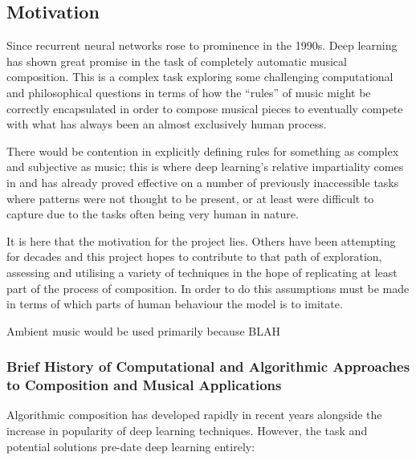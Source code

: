 \documentclass[12pt,]{article}
\begin{document}
\hypertarget{motivation}{%
\subsection{Motivation}\label{motivation}}

Since recurrent neural networks rose to prominence in the 1990s. Deep
learning has shown great promise in the task of completely automatic
musical composition. This is a complex task exploring some challenging
computational and philosophical questions in terms of how the ``rules''
of music might be correctly encapsulated in order to compose musical
pieces to eventually compete with what has always been an almost
exclusively human process.

There would be contention in explicitly defining rules for something as
complex and subjective as music; this is where deep learning's relative
impartiality comes in and has already proved effective on a number of
previously inaccessible tasks where patterns were not thought to be
present, or at least were difficult to capture due to the tasks often
being very human in nature.

It is here that the motivation for the project lies. Others have been
attempting for decades and this project hopes to contribute to that path
of exploration, assessing and utilising a variety of techniques in the
hope of replicating at least part of the process of composition. In
order to do this assumptions must be made in terms of which parts of
human behaviour the model is to imitate.

Ambient music would be used primarily because BLAH

\hypertarget{brief-history-of-computational-and-algorithmic-approaches-to-composition-and-musical-applications}{%
\subsubsection{Brief History of Computational and Algorithmic Approaches
to Composition and Musical
Applications}\label{brief-history-of-computational-and-algorithmic-approaches-to-composition-and-musical-applications}}

Algorithmic composition has developed rapidly in recent years alongside
the increase in popularity of deep learning techniques. However, the
task and potential solutions pre-date deep learning entirely:
\end{document}
